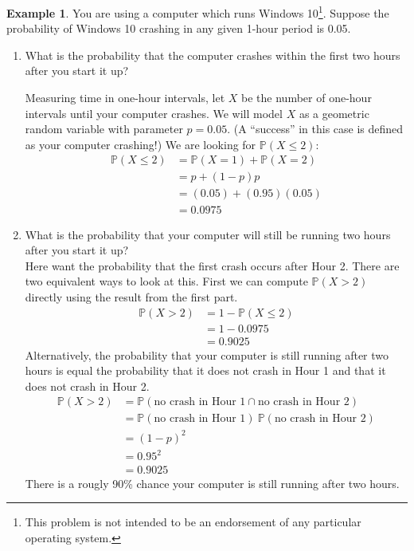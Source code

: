 \documentclass[12pt]{article}
\theoremstyle{definition}
\newtheorem*{example}{Example}
\theoremstyle{remark}
\def\P{{\mathbb P}}
\begin{document}
\begin{example}You are using a computer which runs Windows 10\footnote{This problem is not intended to be an endorsement of any particular operating system.}. Suppose the probability of Windows 10 crashing in any given 1-hour period is 0.05. 

\begin{enumerate}
\item What is the probability that the computer crashes within the first two hours after you start it up?

Measuring time in one-hour intervals, let $X$ be the number of one-hour intervals until your computer crashes. We will model $X$ as a geometric random variable with parameter $p = 0.05$. (A ``success'' in this case is defined as your computer crashing!) We are looking for $\P(X \leq 2)$:
\begin{align*}
\P(X \leq 2) &= \P(X = 1) + \P(X = 2) \\
&= p + (1-p)p \\
&= (0.05) + (0.95)(0.05) \\
&= 0.0975
\end{align*}

\item What is the probability that your computer will still be running two hours after you start it up?\\

Here want the probability that the first crash occurs after Hour 2. There are two equivalent ways to look at this. First we can compute $\P(X > 2)$ directly using the result from the first part.
\begin{align*}
\P(X > 2) &= 1 - \P(X \leq 2) \\
&= 1 - 0.0975 \\
&= 0.9025
\end{align*}
Alternatively, the probability that your computer is still running after two hours is equal the probability that it does not crash in Hour 1 and that it does not crash in Hour 2.
\begin{align*}
\P(X > 2) &= \P(\text{no crash in Hour 1} \cap \text{no crash in Hour 2} ) \\
&= \P(\text{no crash in Hour 1})\: \P(\text{no crash in Hour 2}) \\
&= (1-p)^2\\
&= 0.95^2\\
&= 0.9025
\end{align*}
There is a rougly 90\% chance your computer is still running after two hours. 


\end{enumerate}
\end{example}
\end{document}
